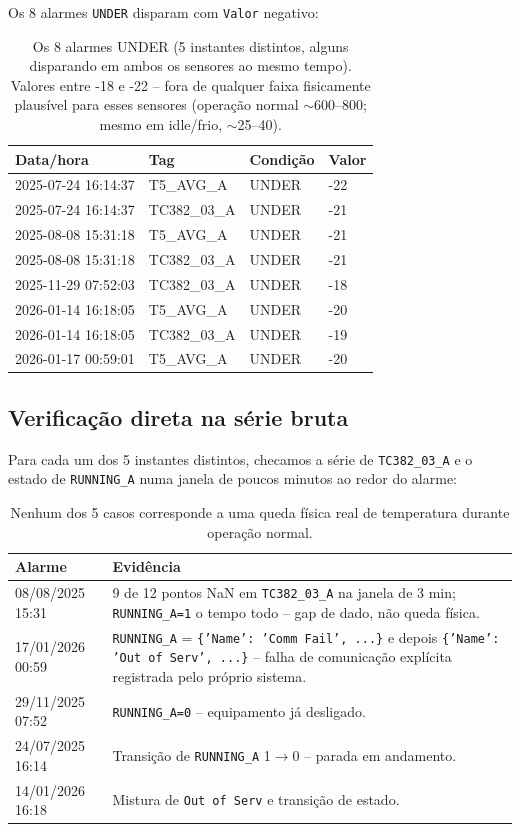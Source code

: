\documentclass[11pt,a4paper]{article}
\begin{document}
Os 8 alarmes \texttt{UNDER} disparam com \texttt{Valor} negativo:

\begin{table}[H]
\centering
\small
\begin{tabular}{@{}llll@{}}
\toprule
\textbf{Data/hora} & \textbf{Tag} & \textbf{Condição} & \textbf{Valor} \\
\midrule
2025-07-24 16:14:37 & T5\_AVG\_A & UNDER & -22 \\
2025-07-24 16:14:37 & TC382\_03\_A & UNDER & -21 \\
2025-08-08 15:31:18 & T5\_AVG\_A & UNDER & -21 \\
2025-08-08 15:31:18 & TC382\_03\_A & UNDER & -21 \\
2025-11-29 07:52:03 & TC382\_03\_A & UNDER & -18 \\
2026-01-14 16:18:05 & T5\_AVG\_A & UNDER & -20 \\
2026-01-14 16:18:05 & TC382\_03\_A & UNDER & -19 \\
2026-01-17 00:59:01 & T5\_AVG\_A & UNDER & -20 \\
\bottomrule
\end{tabular}
\caption{Os 8 alarmes UNDER (5 instantes distintos, alguns disparando em
ambos os sensores ao mesmo tempo). Valores entre -18 e -22 -- fora de
qualquer faixa fisicamente plausível para esses sensores (operação normal
$\sim$600--800; mesmo em idle/frio, $\sim$25--40).}
\end{table}

\subsection{Verificação direta na série bruta}

Para cada um dos 5 instantes distintos, checamos a série de
\texttt{TC382\_03\_A} e o estado de \texttt{RUNNING\_A} numa janela de
poucos minutos ao redor do alarme:

\begin{table}[H]
\centering
\small
\begin{tabular}{@{}lp{9cm}@{}}
\toprule
\textbf{Alarme} & \textbf{Evidência} \\
\midrule
08/08/2025 15:31 & 9 de 12 pontos NaN em \texttt{TC382\_03\_A} na janela de
3 min; \texttt{RUNNING\_A=1} o tempo todo -- gap de dado, não queda física. \\
17/01/2026 00:59 & \texttt{RUNNING\_A} = \texttt{\{'Name': 'Comm Fail', ...\}}
e depois \texttt{\{'Name': 'Out of Serv', ...\}} -- falha de comunicação
explícita registrada pelo próprio sistema. \\
29/11/2025 07:52 & \texttt{RUNNING\_A=0} -- equipamento já desligado. \\
24/07/2025 16:14 & Transição de \texttt{RUNNING\_A} 1$\to$0 -- parada em
andamento. \\
14/01/2026 16:18 & Mistura de \texttt{Out of Serv} e transição de estado. \\
\bottomrule
\end{tabular}
\caption{Nenhum dos 5 casos corresponde a uma queda física real de
temperatura durante operação normal.}
\end{table}
\end{document}
